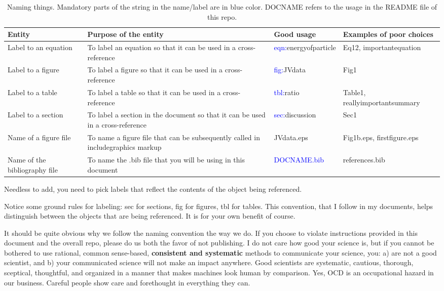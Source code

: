 \documentclass[12 pt]{article}
\begin{document}
\begin{center}
  \begin{longtable}{|p{3cm}|p{5cm}|p{3.5cm}|p{2.5cm}|}
    \caption{Naming things. Mandatory parts of the string in the name/label are in blue color. DOCNAME refers to the usage in the README file of this repo.} \label{tbl:namingthings}\\
    \hline
    \textbf{Entity}  & \textbf{Purpose of the entity} &  \textbf{Good usage} & \textbf{Examples of poor choices} \\\hline
    Label to an equation & To label an equation so that it can be used in a cross-reference & \textcolor{blue}{eqn:}energyofparticle & Eq12, importantequation \\\hline
    Label to a figure & To label a figure so that it can be used in a cross-reference & \textcolor{blue}{fig:}JVdata & Fig1 \\\hline
    Label to a table & To label a table so that it can be used in a cross-reference & \textcolor{blue}{tbl:}ratio & Table1, reallyimportantsummary \\\hline
    Label to a section & To label a section in the document so that it can be used in a cross-reference & \textcolor{blue}{sec:}discussion & Sec1 \\\hline
    Name of a figure file & To name a figure file that can be subsequently called in includegraphics markup & JVdata.eps & Fig1b.eps, firstfigure.eps\\\hline
    Name of the bibliography file & To name the .bib file that you will be using in this document & \textcolor{blue}{DOCNAME.bib} & references.bib \\\hline
  \end{longtable}
\end{center}

Needless to add, you need to pick labels that reflect the contents of the object being referenced.

Notice some ground rules for labeling: sec for sections, fig for figures, tbl for tables. This convention, that I follow in my documents, helps distinguish between the objects that are being referenced. It is for your own benefit of course.

It should be quite obvious why we follow the naming convention the way we do. If you choose to violate instructions provided in this document and the overall repo, please do us both the favor of not publishing. I do not care how good your science is, but if you cannot be bothered to use rational, common sense-based, \textbf{consistent and systematic} methods to communicate your science, you: a) are not a good scientist, and b) your communicated science will not make an impact anywhere. Good scientists are systematic, cautious, thorough, sceptical, thoughtful, and organized in a manner that makes machines look human by comparison. Yes, OCD is an occupational hazard in our business. Careful people show care and forethought in everything they can.
\end{document}
